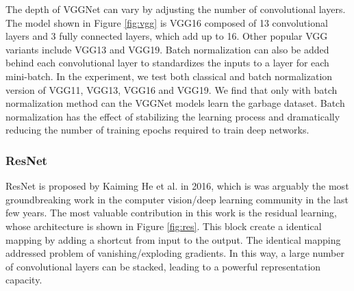 The depth of VGGNet can vary by adjusting the number of convolutional layers. The model shown in Figure \ref{fig:vgg} is VGG16 composed of 13 convolutional layers and 3 fully connected layers, which add up to 16. Other popular VGG variants include VGG13 and VGG19. Batch normalization can also be added behind each convolutional layer to standardizes the inputs to a layer for each mini-batch. In the experiment, we test both classical and batch normalization version of VGG11, VGG13, VGG16 and VGG19. We find that only with batch normalization method can the VGGNet models learn the garbage dataset. Batch normalization has the effect of stabilizing the learning process and dramatically reducing the number of training epochs required to train deep networks\cite{bn_reason}.

\subsubsection{ResNet}
ResNet is proposed by Kaiming He et al.\cite{resnet2016} in 2016, which is was arguably the most groundbreaking work in the computer vision/deep learning community in the last few years. The most valuable contribution in this work is the residual learning, whose architecture is shown in Figure \ref{fig:res}. This block create a identical mapping by adding a shortcut from input to the output. The identical mapping addressed problem of vanishing/exploding gradients. In this way, a large number of convolutional layers can be stacked, leading to a powerful representation capacity.

